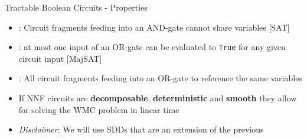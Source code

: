 \documentclass[10pt, aspectratio=169]{beamer}
\begin{document}
\begin{frame}{Tractable Boolean Circuits - Properties}
    \begin{itemize}
        \setlength{\itemsep}{12pt}
        \item {}: Circuit fragments feeding into an AND-gate cannot share variables [SAT]
        \item {}: at most one input of an OR-gate can be evaluated to \texttt{True} for any given circuit input [MajSAT]
        \item {}: All circuit fragments feeding into an OR-gate to reference the same variables
        \item If NNF circuits are \textbf{decomposable}, \textbf{deterministic} and \textbf{smooth} they allow for solving the WMC problem in linear time
        \item \textit{Disclaimer}: We will use SDDs that are an extension of the previous
    \end{itemize}
\end{frame}
\end{document}
